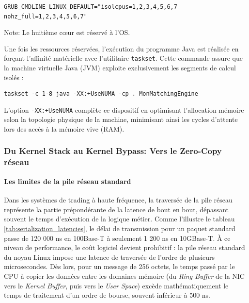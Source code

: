 \begin{lstlisting}[caption={Configuration de l'isolation des cœœurs dans GRUB}]
GRUB_CMDLINE_LINUX_DEFAULT="isolcpus=1,2,3,4,5,6,7 nohz_full=1,2,3,4,5,6,7"
\end{lstlisting}

Note: Le huitième cœur est réservé à l'OS.

Une fois les ressources réservées, l'exécution du programme Java est réalisée en forçant l'affinité matérielle avec l'utilitaire \texttt{taskset}. Cette commande assure que la machine virtuelle Java (JVM) exploite exclusivement les segments de calcul isolés :

\begin{lstlisting}[caption={Exécution avec affinité CPU et optimisation NUMA}]
taskset -c 1-8 java -XX:+UseNUMA -cp . MonMatchingEngine
\end{lstlisting}

L'option \texttt{-XX:+UseNUMA} complète ce dispositif en optimisant l'allocation mémoire selon la topologie physique de la machine, minimisant ainsi les cycles d'attente lors des accès à la mémoire vive (RAM).

\subsubsection{Du Kernel Stack au Kernel Bypass: Vers le Zero-Copy réseau}

\paragraph{Les limites de la pile réseau standard}

Dans les systèmes de trading à haute fréquence, la traversée de la pile réseau représente la partie prépondérante de la latence de bout en bout, dépassant souvent le temps d'exécution de la logique métier. Comme l'illustre le tableau \ref{tab:serialization_latencies}, le délai de transmission pour un paquet standard passe de 120 000 ns en 100Base-T à seulement 1 200 ns en 10GBase-T. À ce niveau de performance, le coût logiciel devient prohibitif : la pile réseau standard du noyau Linux impose une latence de traversée de l'ordre de plusieurs microsecondes. Dès lors, pour un message de 256 octets, le temps passé par le CPU à copier les données entre les domaines mémoire (du \textit{Ring Buffer} de la NIC vers le \textit{Kernel Buffer}, puis vers le \textit{User Space}) excède mathématiquement le temps de traitement d'un ordre de bourse, souvent inférieur à 500 ns. 

